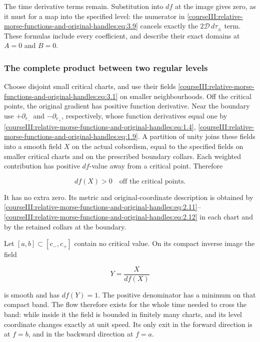 The time derivative terms remain. Substitution into \(df\) at the image gives zero, as it must for a map into the specified level: the numerator in \eqref{courseIII:relative-morse-functions-and-original-handles:eq:3.9} cancels exactly the \(2\mathcal D\,d\tau_\pm\) term. These formulas include every coefficient, and describe their exact domains at \(A=0\) and \(B=0\).

\subsubsection{The complete product between two regular levels}
\label{courseIII:relative-morse-functions-and-original-handles:section-3.3}

Choose disjoint small critical charts, and use their fields \eqref{courseIII:relative-morse-functions-and-original-handles:eq:3.1} on smaller neighbourhoods. Off the critical points, the original gradient has positive function derivative. Near the boundary use \(+\partial_{r_-}\) and \(-\partial_{r_+}\), respectively, whose function derivatives equal one by \eqref{courseIII:relative-morse-functions-and-original-handles:eq:1.4}, \eqref{courseIII:relative-morse-functions-and-original-handles:eq:1.9}. A partition of unity joins these fields into a smooth field \(X\) on the actual cobordism, equal to the specified fields on smaller critical charts and on the prescribed boundary collars. Each weighted contribution has positive \(df\)-value away from a critical point. Therefore

\begin{equation}
df(X)>0\quad\text{off the critical points}.
\label{courseIII:relative-morse-functions-and-original-handles:eq:3.11}
\end{equation}

It has no extra zero. Its metric and original-coordinate description is obtained by \eqref{courseIII:relative-morse-functions-and-original-handles:eq:2.11}--\eqref{courseIII:relative-morse-functions-and-original-handles:eq:2.12} in each chart and by the retained collars at the boundary.

Let \([a,b]\subset[c_-,c_+]\) contain no critical value. On its compact inverse image the field

\begin{equation}
Y=\frac{X}{df(X)}
\label{courseIII:relative-morse-functions-and-original-handles:eq:3.12}
\end{equation}

is smooth and has \(df(Y)=1\). The positive denominator has a minimum on that compact band. The flow therefore exists for the whole time needed to cross the band: while inside it the field is bounded in finitely many charts, and its level coordinate changes exactly at unit speed. Its only exit in the forward direction is at \(f=b\), and in the backward direction at \(f=a\).

